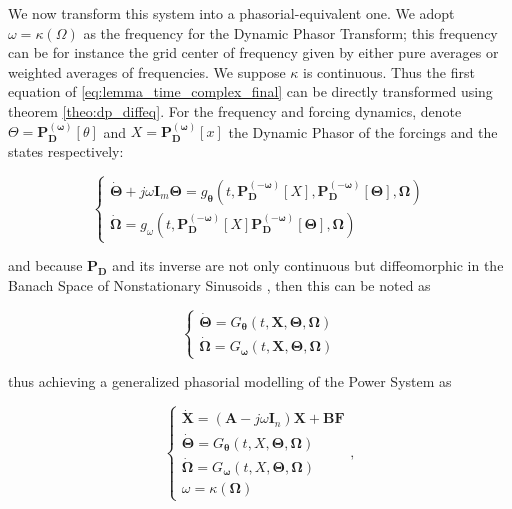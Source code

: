	We now transform this system into a phasorial-equivalent one. We adopt $\omega = \kappa\left(\Omega\right)$ as the frequency for the Dynamic Phasor Transform; this frequency can be for instance the grid center of frequency given by either pure averages or weighted averages of frequencies. We suppose $\kappa$ is continuous. Thus the first equation of \ref{eq:lemma_time_complex_final} can be directly transformed using theorem \ref{theo:dp_diffeq}. For the frequency and forcing dynamics, denote $\Theta = \mathbf{P_D^{\left(\omega\right)}} \left[\theta\right]$ and $X = \mathbf{P_D^{\left(\omega\right)}} \left[x\right]$ the Dynamic Phasor of the forcings and the states respectively:

\begin{equation}
	\left\{\begin{array}{l}
		\dot{\boldsymbol{\Theta}} + j\omega \mathbf{I}_m\boldsymbol{\Theta} = g_{\boldsymbol{\theta}}\left(t,\mathbf{P_D^{\left(-\omega\right)}} \left[X\right],\mathbf{P_D^{\left(-\omega\right)}} \left[\boldsymbol{\Theta}\right],\boldsymbol{\Omega}\right) \\[2mm]
		\dot{\boldsymbol{\Omega}} = g_\omega\left(t,\mathbf{P_D^{\left(-\omega\right)}} \left[X\right]\mathbf{P_D^{\left(-\omega\right)}} \left[\boldsymbol{\Theta}\right],\boldsymbol{\Omega}\right)
	\end{array}\right. \label{eq:lemma_time_complex_final}
\end{equation}

	\noindent and because $\mathbf{P_D}$ and its inverse are not only continuous but diffeomorphic in the Banach Space of Nonstationary Sinusoids \cite{volpatoDynamicPhasorTheory2025}, then this can be noted as

\begin{equation}
	\left\{\begin{array}{l}
		\dot{\boldsymbol{\Theta}} = G_{\boldsymbol{\theta}}\left(t,\mathbf{X},\boldsymbol{\Theta},\boldsymbol{\Omega}\right) \\[2mm]
		\dot{\boldsymbol{\Omega}} = G_{\boldsymbol{\omega}}\left(t,\mathbf{X},\boldsymbol{\Theta},\boldsymbol{\Omega}\right)
	\end{array}\right. 
\end{equation}

	\noindent thus achieving a generalized phasorial modelling of the Power System as

\begin{equation}
	\left\{\begin{array}{l}
		\dot{\mathbf{X}} = \left(\mathbf{A} - j\omega \mathbf{I}_n\right)\mathbf{X} + \mathbf{BF} \\[2mm]
		\dot{\boldsymbol{\Theta}} = G_{\boldsymbol{\theta}}\left(t,X,\boldsymbol{\Theta},\boldsymbol{\Omega}\right) \\[2mm]
		\dot{\boldsymbol{\Omega}} = G_{\boldsymbol{\omega}}\left(t,X,\boldsymbol{\Theta},\boldsymbol{\Omega}\right) \\[2mm]
		\omega = \kappa\left(\boldsymbol{\Omega}\right)
	\end{array}\right. ,\label{eq:lemma_time_complex_final}
\end{equation}


